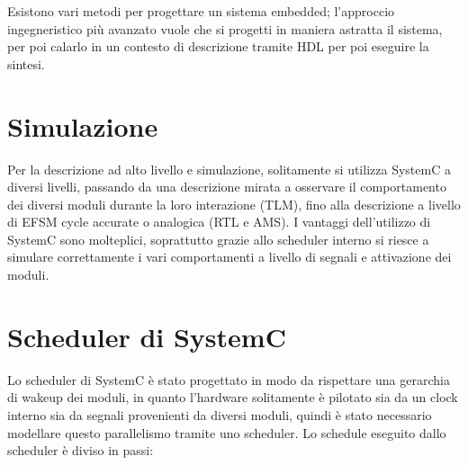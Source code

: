 \documentclass[a4paper,titlepage]{book}
\begin{document}
Esistono vari metodi per progettare un sistema embedded; l'approccio ingegneristico più avanzato vuole che si progetti in maniera astratta il sistema, per poi calarlo in un contesto di descrizione tramite HDL per poi eseguire la sintesi.

\section{Simulazione}

Per la descrizione ad alto livello e simulazione, solitamente si utilizza SystemC a diversi livelli, passando da una descrizione mirata a osservare il comportamento dei diversi moduli durante la loro interazione (TLM), fino alla descrizione a livello di EFSM cycle accurate o analogica (RTL e AMS). I vantaggi dell'utilizzo di SystemC sono molteplici, soprattutto grazie allo scheduler interno si riesce a simulare correttamente i vari comportamenti a livello di segnali e attivazione dei moduli.

\section{Scheduler di SystemC}

Lo scheduler di SystemC è stato progettato in modo da rispettare una gerarchia di wakeup dei moduli, in quanto l'hardware solitamente è pilotato sia da un clock interno sia da segnali provenienti da diversi moduli, quindi è stato necessario modellare questo parallelismo tramite uno scheduler. Lo schedule eseguito dallo scheduler è diviso in passi:
\end{document}
